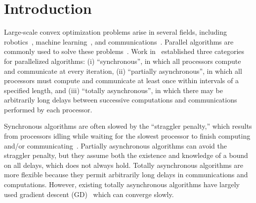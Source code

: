 \documentclass[9pt,shortpaper,twoside,web]{ieeecolor}
\begin{document}
\section{Introduction}
\label{sec:introduction}
Large-scale convex optimization problems arise in several fields, including robotics~\cite{derenick2007convex,deits2015computing,alonso2015multi}, machine learning~\cite{bottou2018optimization,wang2020survey,bubeck2014theory}, and communications~\cite{mattingley2010real,palomar2010convex,shi2015large}.
Parallel algorithms are commonly used to solve these problems~\cite{upadhyaya2013parallel,salman2023parallel,djafri2022dynamic,verbraeken2020survey}. 
Work in~\cite{bertsekas1989parallel} 
established three categories
for parallelized algorithms: 
(i) ``synchronous'', in which all processors compute and communicate at every iteration, 
(ii) ``partially asynchronous'', in which all processors must compute and communicate at least once
within intervals of a specified length, and
(iii) ``totally asynchronous'', in which there may be arbitrarily long delays between
successive computations and communications performed by each processor. 

Synchronous algorithms are often slowed by the ``straggler penalty,'' which results from processors idling while waiting for the slowest
processor to finish computing and/or communicating~\cite{deshmukh2021collaborative,bertsekas1989parallel}.
Partially asynchronous algorithms can avoid the straggler penalty, but they assume both the
existence and knowledge of a bound on all delays, which
does not always hold. 
Totally asynchronous algorithms are more flexible because they permit arbitrarily long delays in 
communications and computations. However, existing totally
asynchronous algorithms have largely used gradient descent (GD)~\cite{wu2023}
which can converge slowly. 
\end{document}
